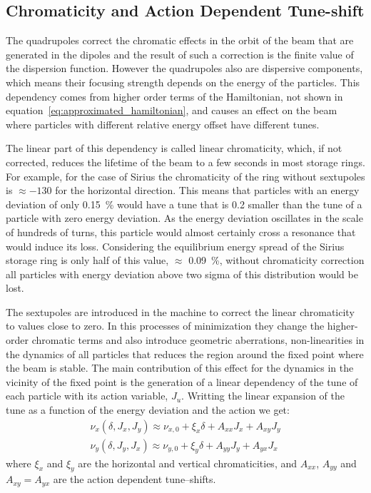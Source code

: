 \subsection{Chromaticity and Action Dependent Tune-shift}\label{sec:chromaticity}

	The quadrupoles correct the chromatic effects in the orbit of the beam that are generated in the dipoles and the result of such a correction is the finite value of the dispersion function. However the quadrupoles also are dispersive components, which means their focusing strength depends on the energy of the particles. This dependency comes from higher order terms of the Hamiltonian, not shown in equation~\eqref{eq:approximated_hamiltonian}, and causes an effect on the beam where particles with different relative energy offset have different tunes.

    The linear part of this dependency is called linear chromaticity, which, if not corrected, reduces the lifetime of the beam to a few seconds in most storage rings. For example, for the case of Sirius the chromaticity of the ring without sextupoles is $\approx -130$ for the horizontal direction. This means that particles with an energy deviation of only \SI{0.15}{\percent} would have a tune that is \SI{0.2}{} smaller than the tune of a particle with zero energy deviation. As the energy deviation oscillates in the scale of hundreds of turns, this particle would almost certainly cross a resonance that would induce its loss. Considering the equilibrium energy spread of the Sirius storage ring is only half of this value, $\approx$ \SI{0.09}{\percent}, without chromaticity correction all particles with energy deviation above two sigma of this distribution would be lost.

	The sextupoles are introduced in the machine to correct the linear chromaticity to values close to zero. In this processes of minimization they change the higher-order chromatic terms and also introduce geometric aberrations, non-linearities in the dynamics of all particles that reduces the region around the fixed point where the beam is stable. The main contribution of this effect for the dynamics in the vicinity of the fixed point is the generation of a linear dependency of the tune of each particle with its action variable, $J_u$. Writting the linear expansion of the tune as a function of the energy deviation and the action we get:
	\begin{align}
		\nu_x(\delta, J_x, J_y) \approx \nu_{x,0} + \xi_x \delta + A_{xx} J_x + A_{xy} J_y \\\nonumber
		\nu_y(\delta, J_y, J_x) \approx \nu_{y,0} + \xi_y \delta + A_{yy} J_y + A_{yx} J_x
	\end{align}
	where $\xi_x$ and $\xi_y$ are the horizontal and vertical chromaticities, and $A_{xx}$, $A_{yy}$ and $A_{xy}=A_{yx}$ are the action dependent tune--shifts.

